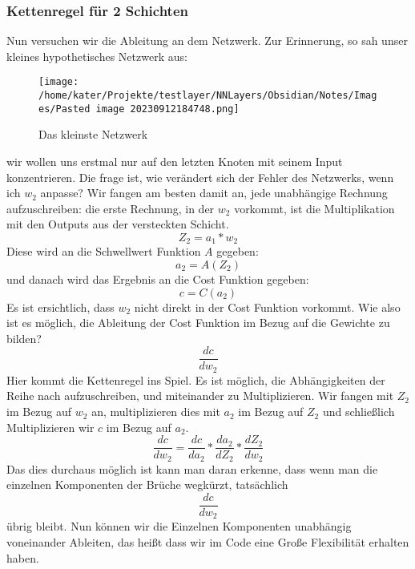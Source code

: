 \documentclass[12pt]{article}
\begin{document}
\subsubsection{ Kettenregel für 2 Schichten}
Nun versuchen wir die Ableitung an dem Netzwerk. Zur Erinnerung, so sah unser kleines hypothetisches Netzwerk aus:
\begin{figure}[H]
\centering
\texttt{[image: /home/kater/Projekte/testlayer/NNLayers/Obsidian/Notes/Images/Pasted image 20230912184748.png]}
\caption{Das kleinste Netzwerk}
\label{Was kommt hier rein?}
\end{figure}
wir wollen uns erstmal nur auf den letzten Knoten mit seinem Input konzentrieren. Die frage ist, wie verändert sich der Fehler des Netzwerks, wenn ich $w_2$ anpasse?
Wir fangen am besten damit an, jede unabhängige Rechnung aufzuschreiben:
die erste Rechnung, in der $w_2$ vorkommt, ist die Multiplikation mit den Outputs aus der versteckten Schicht.
$$Z_2 = a_1*w_2$$
Diese wird an die Schwellwert Funktion $A$ gegeben:
$$a_2 = A(Z_2)$$
und danach wird das Ergebnis an die Cost Funktion gegeben:
$$c=C(a_2)$$
Es ist ersichtlich, dass $w_2$ nicht direkt in der Cost Funktion vorkommt. Wie also ist es möglich, die Ableitung der Cost Funktion im Bezug auf die Gewichte zu bilden?
$$\frac{dc}{dw_2}$$
Hier kommt die Kettenregel ins Spiel. Es ist möglich, die Abhängigkeiten der Reihe nach aufzuschreiben, und miteinander zu Multiplizieren. 
Wir fangen mit $Z_2$ im Bezug auf $w_2$ an, multiplizieren dies mit $a_2$ im Bezug auf $Z_2$ und schließlich Multiplizieren wir $c$ im Bezug auf $a_2$.
$$\frac{ dc }{ dw_{ 2 } }=
\frac{ dc }{ da_{ 2 } }*
\frac{ da_{ 2 } }{ dZ_{ 2 } }*
\frac{ dZ_{ 2 } }{ dw_{ 2 } }$$
Das dies durchaus möglich ist kann man daran erkenne, dass wenn man die einzelnen Komponenten der Brüche wegkürzt, tatsächlich $$\frac{ dc }{ dw_{ 2 } }$$  übrig bleibt.
Nun können wir die Einzelnen Komponenten unabhängig voneinander Ableiten, das heißt dass wir im Code eine Große Flexibilität erhalten haben.
\end{document}
